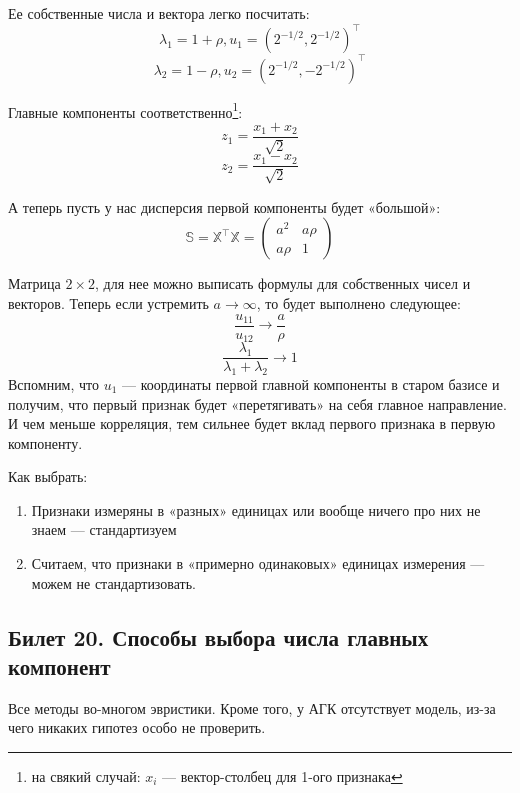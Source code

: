 Ее собственные числа и вектора легко посчитать:
$$\lambda_1  = 1+\rho, u_1 =(2^{-1/2}, 2^{-1/2})^{\intercal}$$
$$\lambda_2 = 1-\rho, u_2 = (2^{-1/2},-2^{-1/2})^{\intercal}$$

Главные компоненты соответственно\footnote{на свякий случай: $x_i$ — вектор-столбец для 1-ого признака}:
 $$z_1 = \frac{x_1+x_2}{\sqrt{2}}$$
 $$z_2 = \frac{x_1-x_2}{\sqrt{2}}$$

 А теперь пусть у нас дисперсия первой компоненты будет «большой»:
 $$\mathbb{S} = \mathbb{X}^{\intercal} \mathbb{X} = \begin{pmatrix}
a^2 & a\rho \\
a\rho & 1
\end{pmatrix}
$$

Матрица $2\times 2$, для нее можно выписать формулы для собственных чисел и векторов. Теперь если устремить $a \rightarrow \infty$, то  будет выполнено следующее:
$$\frac{u_{11}}{u_{12}} \rightarrow \frac{a}{\rho}$$
$$\frac{\lambda_1}{\lambda_1+\lambda_2} \rightarrow 1$$
Вспомним, что $u_{1}$ — координаты первой главной компоненты в старом базисе и получим, что первый признак будет «перетягивать» на себя главное направление. И чем меньше корреляция, тем сильнее будет вклад первого признака в первую компоненту. 

Как выбрать: 
\begin{enumerate}
\item Признаки измеряны в «разных» единицах или вообще ничего про них не знаем — стандартизуем
\item Считаем, что признаки в «примерно одинаковых» единицах измерения — можем не стандартизовать.
\end{enumerate}

 \subsection{Билет 20. Способы выбора числа главных компонент}
Все методы во-многом эвристики. Кроме того, у АГК отсутствует модель, из-за чего никаких гипотез особо не проверить.


